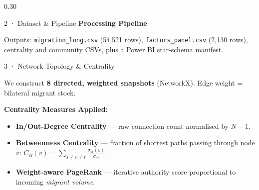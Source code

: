 \documentclass[final]{beamer}
\begin{document}
\begin{frame}[t,fragile]
\begin{columns}[T]
\begin{column}{0.30\textwidth}
\begin{block}{2 · Dataset \& Pipeline}
    \vspace{0.7em}
    \textbf{Processing Pipeline}
    \vspace{0.5em}

    \begin{center}
    \end{center}

    \vspace{0.5em}
    \underline{Outputs:}
    \texttt{migration\_long.csv} (54,521 rows),
    \texttt{factors\_panel.csv} (2,130 rows),
    centrality and community CSVs, plus a Power BI
    star-schema manifest.
  \end{block}

  \begin{block}{3 · Network Topology \& Centrality}

    We construct \textbf{8 directed, weighted snapshots}
    (NetworkX). Edge weight = bilateral migrant stock.

    \vspace{0.5em}
    \textbf{Centrality Measures Applied:}
    \begin{itemize}
      \item \textbf{In/Out-Degree Centrality} — raw
            connection count normalised by $N-1$.
      \item \textbf{Betweenness Centrality} — fraction of
            shortest paths passing through node $v$:
            $C_B(v)=\sum_{s\neq v\neq t}
             \frac{\sigma_{st}(v)}{\sigma_{st}}$
      \item \textbf{Weight-aware PageRank} — iterative
            authority score proportional to incoming
            \emph{migrant volume}.
    \end{itemize}


\end{block}
\end{column}
\end{columns}
\end{frame}
\end{document}
